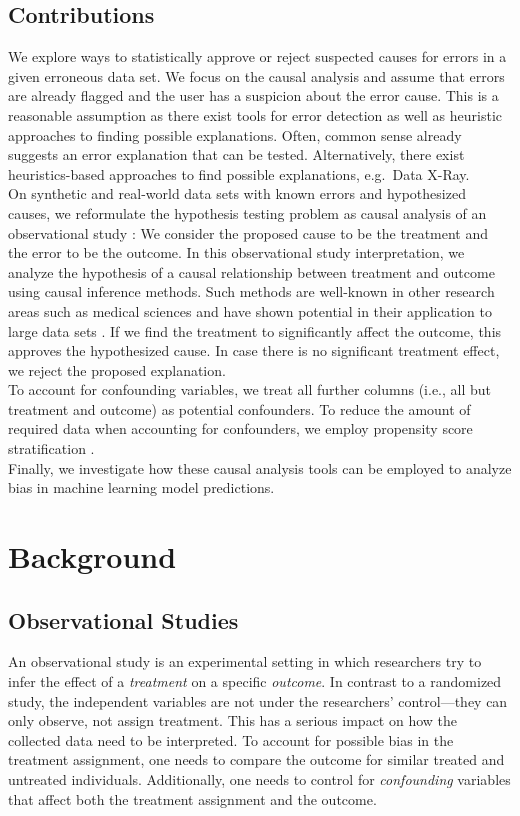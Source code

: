 \documentclass[acmsmall, nonacm, screen]{acmart} %
\begin{document}
\subsection{Contributions}
We explore ways to statistically approve or reject suspected causes for errors in a given erroneous data set.
We focus on the causal analysis and assume that errors are already flagged and the user has a suspicion about the error cause. 
This is a reasonable assumption as there exist tools for error detection as well as heuristic approaches to finding possible explanations. Often, common sense already suggests an error explanation that can be tested. Alternatively, there exist heuristics-based approaches to find possible explanations, e.g.\ Data X-Ray.\\

On synthetic and real-world data sets with known errors and hypothesized causes, we reformulate the hypothesis testing problem as causal analysis of an observational study \cite{Rosenbaum02}: We consider the proposed cause to be the treatment and the error to be the outcome.
In this observational study interpretation, we analyze the hypothesis of a causal relationship between treatment and outcome using causal inference methods. 
Such methods are well-known in other research areas such as medical sciences and have shown potential in their application to large data sets \cite{Robins16}.
If we find the treatment to significantly affect the outcome, this approves the hypothesized cause. In case there is no significant treatment effect, we reject the proposed explanation.\\

To account for confounding variables, we treat all further columns (i.e., all but treatment and outcome) as potential confounders. To reduce the amount of required data when accounting for confounders, we employ propensity score stratification \cite{Austin11}.\\

Finally, we investigate how these causal analysis tools can be employed to analyze bias in machine learning model predictions.\\


\section{Background}

\subsection{Observational Studies}
An observational study is an experimental setting in which researchers try to infer the effect of a \textit{treatment} on a specific \textit{outcome}.
In contrast to a randomized study, the independent variables are not under the researchers' control---they can only observe, not assign treatment.
This has a serious impact on how the collected data need to be interpreted. 
To account for possible bias in the treatment assignment, one needs to compare the outcome for similar treated and untreated individuals.
Additionally, one needs to control for \textit{confounding} variables that affect both the treatment assignment and the outcome.\\
\end{document}
